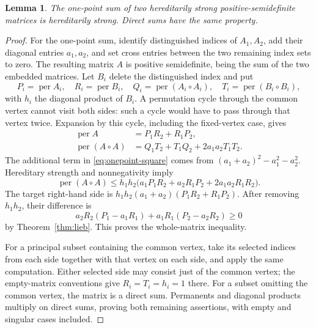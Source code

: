 \documentclass[11pt]{article}
\newtheorem{lemma}[theorem]{Lemma}
\theoremstyle{remark}\newtheorem{remark}[theorem]{Remark}
\DeclareMathOperator{\per}{per}
\begin{document}
\begin{lemma}\label{lem:onepoint}
The one-point sum of two hereditarily strong positive-semidefinite
matrices is hereditarily strong. Direct sums have the same property.
\end{lemma}
\begin{proof}
For the one-point sum, identify distinguished indices of $A_1,A_2$,
add their diagonal entries $a_1,a_2$, and set cross entries between
the two remaining index sets to zero. The resulting matrix $A$ is
positive semidefinite, being the sum of the two embedded matrices.
Let $B_i$ delete the distinguished index and put
\[
P_i=\per A_i,\quad R_i=\per B_i,\quad
Q_i=\per(A_i\circ A_i),\quad T_i=\per(B_i\circ B_i),
\]
with $h_i$ the diagonal product of $B_i$.
A permutation cycle through the common vertex cannot visit both sides:
such a cycle would have to pass through that vertex twice. Expansion
by this cycle, including the fixed-vertex case, gives
\begin{align}
\per A&=P_1R_2+R_1P_2,\label{eq:onepoint-per}\\
\per(A\circ A)&=Q_1T_2+T_1Q_2+2a_1a_2T_1T_2.
\label{eq:onepoint-square}
\end{align}
The additional term in \eqref{eq:onepoint-square} comes from
$(a_1+a_2)^2-a_1^2-a_2^2$. Hereditary strength and nonnegativity imply
\[
\per(A\circ A)\le h_1h_2
\bigl(a_1P_1R_2+a_2R_1P_2+2a_1a_2R_1R_2\bigr).
\]
The target right-hand side is
$h_1h_2(a_1+a_2)(P_1R_2+R_1P_2)$. After removing $h_1h_2$, their
difference is
\[
a_2R_2(P_1-a_1R_1)+a_1R_1(P_2-a_2R_2)\ge0
\]
by Theorem~\ref{thm:lieb}. This proves the whole-matrix inequality.

For a principal subset containing the common vertex, take its selected
indices from each side together with that vertex on each side, and apply
the same computation. Either selected side may consist just of the common
vertex; the empty-matrix conventions give $R_i=T_i=h_i=1$ there.
For a subset omitting the common vertex, the matrix is a direct sum.
Permanents and diagonal products multiply on direct sums, proving both
remaining assertions, with empty and singular cases included.
\end{proof}
\end{document}

